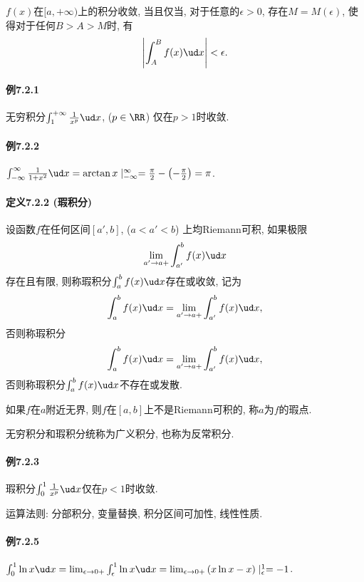 $f(x)$在$[a,+\infty)$上的积分收敛, 当且仅当, 对于任意的$\epsilon>0$, 存在$M=M(\epsilon)$,
使得对于任何$B>A>M$时, 有
\[
\left|\int_{A}^{B}f(x)\ud x\right|<\epsilon.
\]


\paragraph{例7.2.1}

无穷积分$\int_{1}^{+\infty}\frac{1}{x^{p}}\ud x$, ($p\in\RR$) 仅在$p>1$时收敛.

\paragraph{例7.2.2}

$\int_{-\infty}^{\infty}\frac{1}{1+x^{2}}\ud x=\arctan x\mid_{-\infty}^{\infty}=\frac{\pi}{2}-\left(-\frac{\pi}{2}\right)=\pi$.

\paragraph{定义7.2.2 (瑕积分)}

设函数$f$在任何区间$[a',b]$, ($a<a'<b$) 上均Riemann可积, 如果极限
\[
\lim_{a'\to a+}\int_{a'}^{b}f(x)\ud x
\]
存在且有限, 则称瑕积分$\int_{a}^{b}f(x)\ud x$存在或收敛, 记为
\[
\int_{a}^{b}f(x)\ud x=\lim_{a'\to a+}\int_{a'}^{b}f(x)\ud x,
\]
否则称瑕积分
\[
\int_{a}^{b}f(x)\ud x=\lim_{a'\to a+}\int_{a'}^{b}f(x)\ud x,
\]
否则称瑕积分$\int_{a}^{b}f(x)\ud x$不存在或发散. 

如果$f$在$a$附近无界, 则$f$在$[a,b]$上不是Riemann可积的, 称$a$为$f$的瑕点.

无穷积分和瑕积分统称为广义积分, 也称为反常积分.

\paragraph{例7.2.3}

瑕积分$\int_{0}^{1}\frac{1}{x^{p}}\ud x$仅在$p<1$时收敛.

运算法则: 分部积分, 变量替换, 积分区间可加性, 线性性质.

\paragraph{例7.2.5}

$\int_{0}^{1}\ln x\ud x=\lim_{\epsilon\to0+}\int_{\epsilon}^{1}\ln x\ud x=\lim_{\epsilon\to0+}\left(x\ln x-x\right)\mid_{\epsilon}^{1}=-1$.

